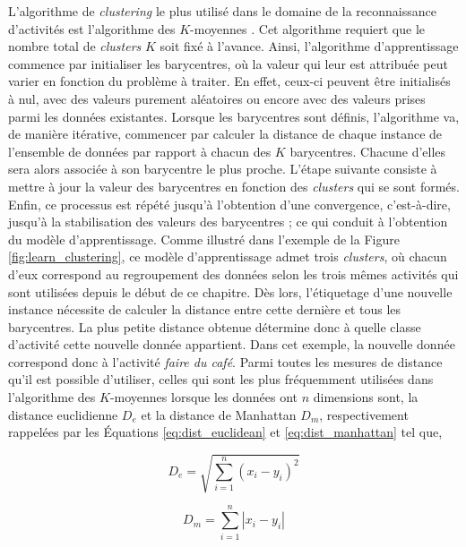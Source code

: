 L'algorithme de \textit{clustering} le plus utilisé dans le domaine de la reconnaissance d'activités est l'algorithme des $K$-moyennes \citep{Messing2009, Kovashka2010}. Cet algorithme requiert que le nombre total de \textit{clusters} $K$ soit fixé à l'avance. Ainsi, l'algorithme d'apprentissage commence par initialiser les barycentres, où la valeur qui leur est attribuée peut varier en fonction du problème à traiter. En effet, ceux-ci peuvent être initialisés à nul, avec des valeurs purement aléatoires ou encore avec des valeurs prises parmi les données existantes. Lorsque les barycentres sont définis, l'algorithme va, de manière itérative, commencer par calculer la distance de chaque instance de l'ensemble de données par rapport à chacun des $K$ barycentres. Chacune d'elles sera alors associée à son barycentre le plus proche. L'étape suivante consiste à mettre à jour la valeur des barycentres en fonction des \textit{clusters} qui se sont formés. Enfin, ce processus est répété jusqu'à l'obtention d'une convergence, c'est-à-dire, jusqu'à la stabilisation des valeurs des barycentres ; ce qui conduit à l'obtention du modèle d'apprentissage. Comme illustré dans l'exemple de la Figure \ref{fig:learn_clustering}, ce modèle d'apprentissage admet trois \textit{clusters}, où chacun d'eux correspond au regroupement des données selon les trois mêmes activités qui sont utilisées depuis le début de ce chapitre. Dès lors, l'étiquetage d'une nouvelle instance nécessite de calculer la distance entre cette dernière et tous les barycentres. La plus petite distance obtenue détermine donc à quelle classe d'activité cette nouvelle donnée appartient. Dans cet exemple, la nouvelle donnée correspond donc à l'activité \og \textit{faire du café}\fg. Parmi toutes les mesures de distance qu'il est possible d'utiliser, celles qui sont les plus fréquemment utilisées dans l'algorithme des $K$-moyennes lorsque les données ont $n$ dimensions sont, la distance euclidienne $D_e$ et la distance de Manhattan $D_m$, respectivement rappelées par les Équations \ref{eq:dist_euclidean} et \ref{eq:dist_manhattan} tel que,

\begin{equation}
	\label{eq:dist_euclidean}
	D_e = \sqrt{\sum_{i=1}^{n}(x_i-y_i)^2}
\end{equation}

\begin{equation}
	\label{eq:dist_manhattan}
	D_m = \sum_{i=1}^{n}\left|x_i-y_i\right|
\end{equation}

